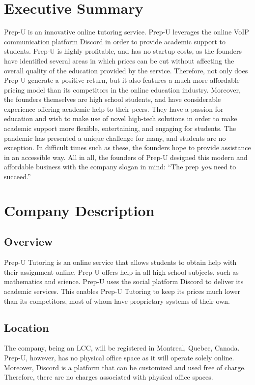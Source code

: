 \documentclass{business}
\begin{document}
    \maketitle
    \tableofcontents
    \newpage
    \section{Executive Summary}
    Prep-U is an innovative online tutoring service. Prep-U leverages the online VoIP communication platform Discord in order to provide academic support to students. Prep-U is highly profitable, and has no startup costs, as the founders have identified several areas in which prices can be cut without affecting the overall quality of the education provided by the service. Therefore, not only does Prep-U generate a positive return, but it also features a much more affordable pricing model than its competitors in the online education industry. Moreover, the founders themselves are high school students, and have considerable experience offering academic help to their peers. They have a passion for education and wish to make use of novel high-tech solutions in order to make academic support more flexible, entertaining, and engaging for students. The pandemic has presented a unique challenge for many, and students are no exception. In difficult times such as these, the founders hope to provide assistance in an accessible way. All in all, the founders of Prep-U designed this modern and affordable business with the company slogan in mind: ``The prep \emph{you} need to succeed.''
    \section{Company Description}
    \subsection{Overview}
    Prep-U Tutoring is an online service that allows students to obtain help with their assignment online. Prep-U offers help in all high school subjects, such as mathematics and science. Prep-U uses the social platform Discord to deliver its academic services. This enables Prep-U Tutoring to keep its prices much lower than its competitors, most of whom have proprietary systems of their own.
    \subsection{Location}
    The company, being an LCC, will be registered in Montreal, Quebec, Canada. Prep-U, however, has no physical office space as it will operate solely online. Moreover, Discord is a platform that can be customized and used free of charge. Therefore, there are no charges associated with physical office spaces. 
\end{document}
